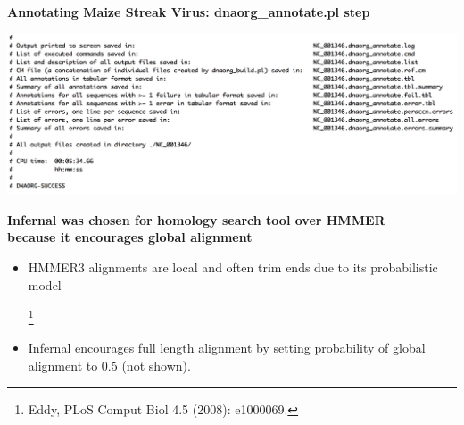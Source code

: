 \documentclass[landscape]{slides}
\begin{document}
\begin{slide}
\begin{center}
\textbf{Annotating Maize Streak Virus: dnaorg\_annotate.pl step} 

\includegraphics[width=10.5in]{figs/dnaorg-annotate-output2}

\end{center}
\vfill
\end{slide}
\begin{slide}
\begin{center}
\textbf{Infernal was chosen for homology search tool over HMMER 
  \\ because it encourages global alignment}

\begin{itemize}
\item HMMER3 alignments are local and often trim ends due to its
  probabilistic model

\footnote{Eddy,
  PLoS Comput Biol 4.5 (2008): e1000069.}

\item Infernal encourages full length alignment by setting probability of
  global alignment to 0.5 (not shown). 
\end{itemize}

\vfill
\end{center}
\end{slide}
\end{document}

